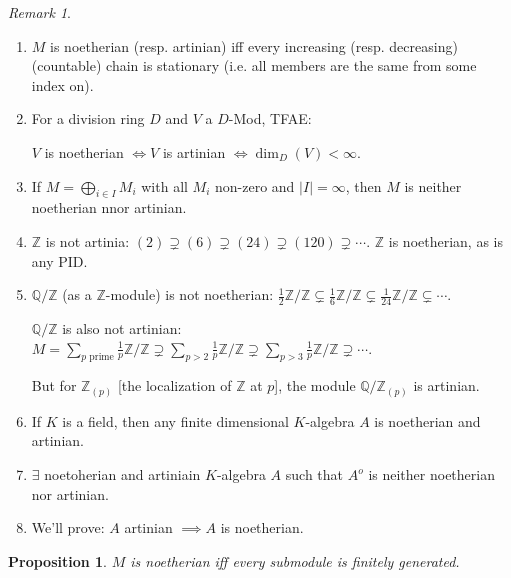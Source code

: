\documentclass{article}
\theoremstyle{definition}
\theoremstyle{plain}
\newtheorem{proposition}[theorem]{Proposition}
\theoremstyle{remark}
\newtheorem{remark}[theorem]{Remark}
\begin{document}
    \begin{remark}
        \begin{enumerate}[label=\roman*)]
            \item \(M\) is noetherian (resp. artinian) iff every increasing (resp. decreasing) (countable) chain is stationary (i.e. all members are the same from some index on).
            \item For a division ring \(D\) and \(V\) a \(D\)-Mod, TFAE:
            
            \(V\) is noetherian \(\iff V\) is artinian \(\iff \dim_D(V) < \infty\).

            \item If \(M = \bigoplus_{i\in I} M_i\) with all \(M_i\) non-zero and \(\vert I \vert = \infty\), then \(M\) is neither noetherian nnor artinian.
            \item \(\mathbb{Z}\) is not artinia: \((2) \supsetneq (6) \supsetneq (24) \supsetneq (120) \supsetneq \cdots\). \(\mathbb{Z}\) is noetherian, as is any PID.
            \item \(\mathbb{Q} / \mathbb{Z}\) (as a \(\mathbb{Z}\)-module) is not noetherian: \(\frac{1}{2}\mathbb{Z} / \mathbb{Z} \subsetneq \frac{1}{6}\mathbb{Z} / \mathbb{Z}  \subsetneq \frac{1}{24} \mathbb{Z} / \mathbb{Z} \subsetneq \cdots\).
            
            \(\mathbb{Q} / \mathbb{Z}\) is also not artinian: \(M = \sum_{p \text{ prime}} \frac{1}{p}\mathbb{Z} / \mathbb{Z} \supsetneq \sum_{p > 2} \frac{1}{p} \mathbb{Z}  / \mathbb{Z} \supsetneq \sum_{p > 3} \frac{1}{p}\mathbb{Z} / \mathbb{Z} \supsetneq \cdots\).

            But for \(\mathbb{Z}_{(p)}\) [the localization of \(\mathbb{Z}\) at \(p\)], the module \(\mathbb{Q} / \mathbb{Z}_{(p)}\) is artinian.

            \item If \(K\) is a field, then any finite dimensional \(K\)-algebra \(A\) is noetherian and artinian.
            \item \(\exists\) noetoherian and artiniain \(K\)-algebra \(A\) such that \(A^o\) is neither noetherian nor artinian.
            \item We'll prove: \(A\) artinian \(\implies A\) is noetherian. 
        \end{enumerate} 
    \end{remark}

    \begin{proposition}
        \(M\) is noetherian iff every submodule is finitely generated.
    \end{proposition}
\end{document}
